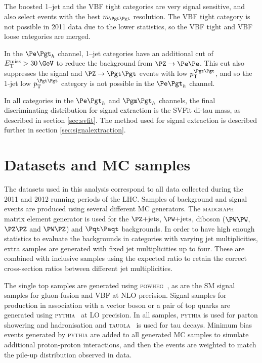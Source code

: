 The boosted 1--jet and the VBF tight categories are very 
signal sensitive, and also select events with the best $m_{\Pgt\Pgt}$ resolution.
The VBF tight category is not possible in 2011 data due to the lower statistics,
so the VBF tight and VBF loose categories are merged. 

In the $\etau$ channel, 1--jet categories have an additional cut of $\MET >
30\,\GeV$ to reduce the background from $\PZ\to\Pe\Pe$. This cut also suppresses the
signal and $\ZToTauTau$ events with low $\pt^{\Pgt\Pgt}$, and so the 1-jet low
$\pt^{\Pgt\Pgt}$ category is not possible in the $\etau$ channel. 

In all categories in the $\etau$ and $\mutau$ channels, the final discriminating
distribution for signal extraction is the SVFit di-tau mass, as described in
section \ref{sec:svfit}. The method used for signal extraction is described
further in section \ref{sec:signalextraction}.

\section{Datasets and MC samples}
\label{sec:dataandMC}

The datasets used in this analysis correspond to all data collected during the 2011 and
2012 running periods of the \ac{LHC}. Samples of background and signal events are produced using several different
\ac{MC} generators. The \textsc{madgraph}~\cite{Alwall:2011uj} matrix element
generator is used for the $\ZJets$, $\WJets$, diboson ($\PW\PW$, $\PZ\PZ$ and
$\PW\PZ$) and $\ttbar$ backgrounds. 
In order to have high enough statistics to evaluate the
backgrounds in categories with varying jet multiplicities, extra samples are
generated with fixed jet multiplicities up to four. These are combined with
inclusive samples using the expected ratio to retain the correct cross-section
ratios between different jet multiplicities. 

The single top samples are generated using
\textsc{powheg}~\cite{Frixione:2007vw,Alioli:2010xd,Alioli:2010xa}, as are the
\ac{SM} signal samples for gluon-fusion and \ac{VBF} at \ac{NLO} precision. Signal
samples for production in association with a vector boson or a pair of top
quarks are generated using
\textsc{pythia}~\cite{Sjostrand:2006za} at \ac{LO} precision. In all
samples, \textsc{pythia} is used for parton showering and hadronisation and
\textsc{tauola}~\cite{TAUOLA} is used for tau decays. Minimum bias events
generated by \textsc{pythia} are added to all generated \ac{MC} samples
to simulate additional proton-proton interactions, and then the events are
weighted to match the pile-up distribution observed in data. 

